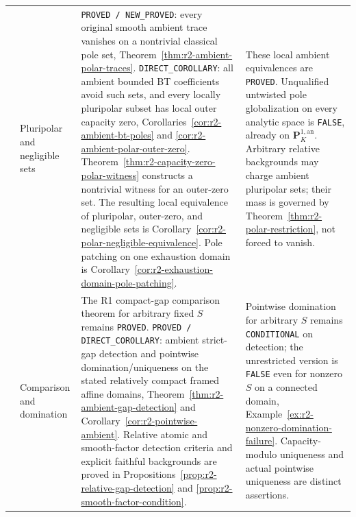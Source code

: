 \documentclass[11pt,a4paper]{article}
\numberwithin{equation}{section}
\theoremstyle{definition}
\theoremstyle{remark}
\newcommand{\an}{\mathrm{an}}
\begin{document}
\begin{longtable}{@{}>{\raggedright\arraybackslash}p{}>{\raggedright\arraybackslash}p{}>{\raggedright\arraybackslash}p{}>{\raggedright\arraybackslash}p{}@{}}
8 & Pluripolar and negligible sets &
\texttt{PROVED / NEW\_PROVED}: every original smooth ambient trace
vanishes on a nontrivial classical pole set,
Theorem~\ref{thm:r2-ambient-polar-traces}.
\texttt{DIRECT\_COROLLARY}: all ambient bounded BT coefficients avoid
such sets, and every locally pluripolar subset has local outer
capacity zero, Corollaries~\ref{cor:r2-ambient-bt-poles} and
\ref{cor:r2-ambient-polar-outer-zero}.
Theorem~\ref{thm:r2-capacity-zero-polar-witness} constructs a
nontrivial witness for an outer-zero set. The resulting local
equivalence of pluripolar, outer-zero, and negligible sets is
Corollary~\ref{cor:r2-polar-negligible-equivalence}.
Pole patching on one exhaustion domain is
Corollary~\ref{cor:r2-exhaustion-domain-pole-patching}. &
These local ambient equivalences are \texttt{PROVED}.
Unqualified untwisted pole globalization on every analytic space is
\texttt{FALSE}, already on $\mathbf P^{1,\an}_K$.
Arbitrary relative backgrounds may charge ambient pluripolar sets;
their mass is governed by
Theorem~\ref{thm:r2-polar-restriction}, not forced to vanish.\\[5pt]

9 & Comparison and domination &
The R1 compact-gap comparison theorem for arbitrary fixed $S$
remains \texttt{PROVED}.
\texttt{PROVED / DIRECT\_COROLLARY}: ambient strict-gap detection and
pointwise domination/uniqueness on the stated relatively compact
framed affine domains, Theorem~\ref{thm:r2-ambient-gap-detection}
and Corollary~\ref{cor:r2-pointwise-ambient}.
Relative atomic and smooth-factor detection criteria and explicit
faithful backgrounds are proved in
Propositions~\ref{prop:r2-relative-gap-detection} and
\ref{prop:r2-smooth-factor-condition}. &
Pointwise domination for arbitrary $S$ remains
\texttt{CONDITIONAL} on detection; the unrestricted version is
\texttt{FALSE} even for nonzero $S$ on a connected domain,
Example~\ref{ex:r2-nonzero-domination-failure}.
Capacity-modulo uniqueness and actual pointwise uniqueness are
distinct assertions.\\[5pt]


\end{longtable}
\end{document}

